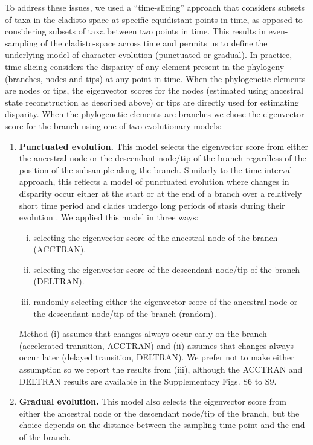 \documentclass[12pt,letterpaper]{article}
\begin{document}
To address these issues, we used a ``time-slicing'' approach that considers subsets of taxa in the cladisto-space at specific equidistant points in time, as opposed to considering subsets of taxa between two points in time.
This results in even-sampling of the cladisto-space across time and permits us to define the underlying model of character evolution (punctuated or gradual).  
In practice, time-slicing considers the disparity of any element present in the phylogeny (branches, nodes and tips) at any point in time.
When the phylogenetic elements are nodes or tips, the eigenvector scores for the nodes (estimated using ancestral state reconstruction as described above) or tips are directly used for estimating disparity.
When the phylogenetic elements are branches we chose the eigenvector score for the branch using one of two evolutionary models:
\begin{enumerate}
    \item{\textbf{Punctuated evolution.}} 
    This model selects the eigenvector score from either the ancestral node or the descendant node/tip of the branch regardless of the position of the subsample along the branch. 
    Similarly to the time interval approach, this reflects a model of punctuated evolution where changes in disparity occur either at the start or at the end of a branch over a relatively short time period and clades undergo long periods of stasis during their evolution \cite{Gould1977,Hunt21042015}.
    We applied this model in three ways: 
    \begin{enumerate}[(i)]
      \item selecting the eigenvector score of the ancestral node of the branch (ACCTRAN).
      \item selecting the eigenvector score of the descendant node/tip of the branch (DELTRAN).
      \item randomly selecting either the eigenvector score of the ancestral node or the descendant node/tip of the branch (random).
    \end{enumerate}
    Method (i) assumes that changes always occur early on the branch (accelerated transition, ACCTRAN) and (ii) assumes that changes always occur later (delayed transition, DELTRAN).
    We prefer not to make either assumption so we report the results from (iii), although the ACCTRAN and DELTRAN results are available in the Supplementary Figs. S6 to S9.
    \item{\textbf{Gradual evolution.}}
    This model also selects the eigenvector score from either the ancestral node or the descendant node/tip of the branch, but the choice depends on the distance between the sampling time point and the end of the branch.

\end{enumerate}
\end{document}
